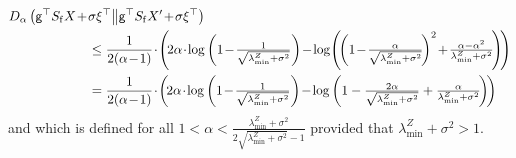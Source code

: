 \documentclass[11pt]{article}
\theoremstyle{definition}
\theoremstyle{plain}
\providecommand{\KLDA}[2]{{D_{\alpha} \left( #1 \middle\| #2 \right)}}
\begin{document}
\begin{align}
    &\KLDA{\mathsf{g}^{\top}S_{\mathrm{f}}X \hspace{-0.15em}+\hspace{-0.15em} \sigma \xi^{\top}}{\mathsf{g}^{\top}S_{\mathrm{f}}X' \hspace{-0.15em}+\hspace{-0.15em} \sigma \xi^{\top}}\\
    &\qquad\qquad\qquad\leq \frac{1}{2(\alpha \hspace{-0.15em}-\hspace{-0.15em} 1)}\hspace{-0.15em}\cdot\hspace{-0.15em} \left(\hspace{-0.15em}2\alpha \hspace{-0.15em}\cdot\hspace{-0.15em} \log\left(1 \hspace{-0.15em}-\hspace{-0.15em} \tfrac{1}{\sqrt{\lambda^{Z}_{\min} + \sigma^2}}\right) \hspace{-0.15em}-\hspace{-0.15em} \log\hspace{-0.15em}\left(\hspace{-0.15em}\left(1 \hspace{-0.15em}-\hspace{-0.15em} \tfrac{\alpha}{\sqrt{\lambda^{Z}_{\min} + \sigma^2}}\hspace{-0.15em}\right)^2 \hspace{-0.15em}+\hspace{-0.15em} \tfrac{\alpha - \alpha^2}{\lambda^{Z}_{\min} + \sigma^2}\hspace{-0.15em}\right)\hspace{-0.15em}\right)\\
    &\qquad\qquad\qquad= \frac{1}{2(\alpha \hspace{-0.15em}-\hspace{-0.15em} 1)}\hspace{-0.15em}\cdot\hspace{-0.15em} \left(\hspace{-0.15em}2\alpha \hspace{-0.15em}\cdot\hspace{-0.15em} \log\left(1 \hspace{-0.15em}-\hspace{-0.15em} \tfrac{1}{\sqrt{\lambda^{Z}_{\min} + \sigma^2}}\right) \hspace{-0.15em}-\hspace{-0.15em} \log\left(1 - \tfrac{2\alpha}{\sqrt{\lambda^{Z}_{\min} + \sigma^2}} + \tfrac{\alpha}{\lambda^{Z}_{\min} + \sigma^2}\hspace{-0.15em}\right)\hspace{-0.15em}\right)
\end{align}
and which is defined for all $1 < \alpha < \tfrac{\lambda^{Z}_{\min} + \sigma^2}{2\sqrt{\lambda^{Z}_{\min} + \sigma^2} - 1}$ provided that $\lambda^{Z}_{\min} + \sigma^2 > 1$. 
\end{document}
